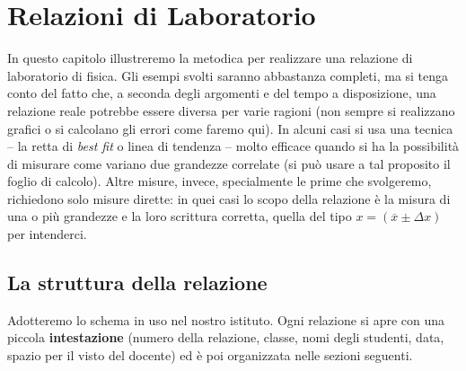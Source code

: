 \chapter{Relazioni di Laboratorio}
In questo capitolo illustreremo la metodica per realizzare una relazione di laboratorio di fisica. Gli esempi svolti saranno abbastanza completi, ma si tenga conto del fatto che, a seconda degli argomenti e del tempo a disposizione, una relazione reale potrebbe essere diversa per varie ragioni (non sempre si realizzano grafici o si calcolano gli errori come faremo qui). In alcuni casi si usa una tecnica -- la retta di \emph{best fit} o linea di tendenza -- molto efficace quando si ha la possibilità di misurare come variano due grandezze correlate (si può usare a tal proposito il foglio di calcolo). Altre misure, invece, specialmente le prime che svolgeremo, richiedono solo misure dirette: in quei casi lo scopo della relazione è la misura di una o più grandezze e la loro scrittura corretta, quella del tipo $x=\left( \overline{x} \pm \Delta x\right)$ per intenderci.

\section{La struttura della relazione}
Adotteremo lo schema in uso nel nostro istituto. Ogni relazione si apre con una piccola \textbf{intestazione} (numero della relazione, classe, nomi degli studenti, data, spazio per il visto del docente) ed è poi organizzata nelle sezioni seguenti.


